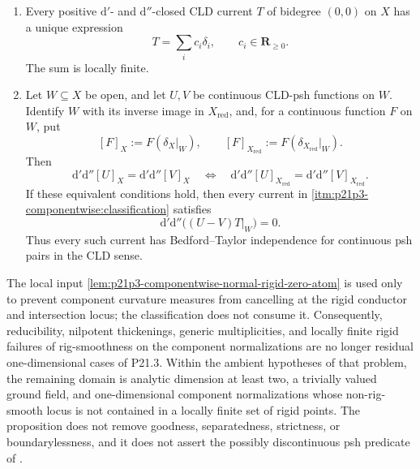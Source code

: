 \begin{proposition}
\begin{enumerate}
\item\label{itm:p21p3-componentwise:classification}
Every positive $\mathrm d'$- and $\mathrm d''$-closed CLD current $T$ of
bidegree $(0,0)$ on $X$ has a unique expression
\begin{equation}
 \label{eq:p21p3-componentwise-classification}
                         T=\sum_i c_i\delta_i,
                         \qquad c_i\in\mathbf R_{\geq0}.
\end{equation}
The sum is locally finite.

\item\label{itm:p21p3-componentwise:bedford-taylor}
Let $W\subseteq X$ be open, and let $U,V$ be continuous CLD-psh functions
on $W$.  Identify $W$ with its inverse image in $X_{\mathrm{red}}$, and,
for a continuous function $F$ on $W$, put
\[
 [F]_X:=F(\delta_X|_W),
 \qquad
 [F]_{X_{\mathrm{red}}}:=
      F(\delta_{X_{\mathrm{red}}}|_W).
\]
Then
\begin{equation}
 \label{eq:p21p3-componentwise-curvature-equivalence}
 \mathrm d'\mathrm d''[U]_X=\mathrm d'\mathrm d''[V]_X
 \quad\Longleftrightarrow\quad
 \mathrm d'\mathrm d''[U]_{X_{\mathrm{red}}}
  =\mathrm d'\mathrm d''[V]_{X_{\mathrm{red}}}.
\end{equation}
If these equivalent conditions hold, then every current in
\cref{itm:p21p3-componentwise:classification} satisfies
\begin{equation}
 \label{eq:p21p3-componentwise-bt-conclusion}
             \mathrm d'\mathrm d''\bigl((U-V)T|_W\bigr)=0.
\end{equation}
Thus every such current has Bedford--Taylor independence for continuous
psh pairs in the CLD sense.
\end{enumerate}
\end{proposition}

\begin{remark}
\label{rem:p21p3-componentwise-residual}
The local input
\cref{lem:p21p3-componentwise-normal-rigid-zero-atom} is used only to prevent
component curvature measures from cancelling at the rigid conductor and
intersection locus; the classification does not consume it.  Consequently,
reducibility, nilpotent thickenings, generic multiplicities, and locally
finite rigid failures of rig-smoothness on the component normalizations are
no longer residual one-dimensional cases of P21.3.  Within the ambient
hypotheses of that problem, the remaining domain is analytic dimension at
least two, a trivially valued ground field, and one-dimensional component
normalizations whose non-rig-smooth locus is not contained in a locally
finite set of rigid points.  The proposition does not remove goodness,
separatedness, strictness, or boundarylessness, and it does not assert the
possibly discontinuous psh predicate of
\cite[Definition~8.6.2]{CLD25}.
\end{remark}
